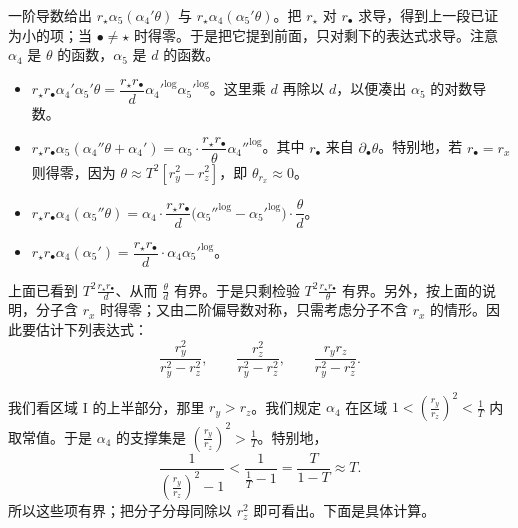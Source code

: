 一阶导数给出 $r_\star\alpha_5(\alpha_4'\theta)$ 与 $r_\star\alpha_4(\alpha_5'\theta)$。把 $r_\star$ 对 $r_\bullet$ 求导，得到上一段已证为小的项；当 $\bullet\ne\star$ 时得零。于是把它提到前面，只对剩下的表达式求导。注意 $\alpha_4$ 是 $\theta$ 的函数，$\alpha_5$ 是 $d$ 的函数。
\begin{itemize}[leftmargin=2.2em,itemsep=0.25em]
\item $r_\star r_\bullet\alpha_4'\alpha_5'\theta=\dfrac{r_\star r_\bullet}{d}{\alpha_4'}^{\log}{\alpha_5'}^{\log}$。这里乘 $d$ 再除以 $d$，以便凑出 $\alpha_5$ 的对数导数。
\item $r_\star r_\bullet\alpha_5(\alpha_4''\theta+\alpha_4')=\alpha_5\cdot\dfrac{r_\star r_\bullet}{\theta}{\alpha_4''}^{\log}$。其中 $r_\bullet$ 来自 $\partial_\bullet\theta$。特别地，若 $r_\bullet=r_x$ 则得零，因为 $\theta\approx T^2[r_y^2-r_z^2]$，即 $\theta_{r_x}\approx0$。
\end{itemize}

\begin{itemize}[leftmargin=2.2em,itemsep=0.25em]
\item $r_\star r_\bullet\alpha_4(\alpha_5''\theta)=\alpha_4\cdot\dfrac{r_\star r_\bullet}{d}\big({\alpha_5''}^{\log}-{\alpha_5'}^{\log}\big)\cdot\dfrac{\theta}{d}$。
\item $r_\star r_\bullet\alpha_4(\alpha_5')=\dfrac{r_\star r_\bullet}{d}\cdot\alpha_4{\alpha_5'}^{\log}$。
\end{itemize}

上面已看到 $T^2\frac{r_\star r_\bullet}{d}$、从而 $\frac{\theta}{d}$ 有界。于是只剩检验 $T^2\frac{r_\star r_\bullet}{\theta}$ 有界。另外，按上面的说明，分子含 $r_x$ 时得零；又由二阶偏导数对称，只需考虑分子不含 $r_x$ 的情形。因此要估计下列表达式：
\[
\frac{r_y^2}{r_y^2-r_z^2},\qquad
\frac{r_z^2}{r_y^2-r_z^2},\qquad
\frac{r_yr_z}{r_y^2-r_z^2}.
\]

我们看区域 I 的上半部分，那里 $r_y>r_z$。我们规定 $\alpha_4$ 在区域 $1<\left(\frac{r_y}{r_z}\right)^2<\frac1T$ 内取常值。于是 $\alpha_4$ 的支撑集是 $\left(\frac{r_y}{r_z}\right)^2>\frac1T$。特别地，
\[
\frac{1}{\left(\frac{r_y}{r_z}\right)^2-1}<\frac{1}{\frac1T-1}=\frac{T}{1-T}\approx T.
\]
所以这些项有界；把分子分母同除以 $r_z^2$ 即可看出。下面是具体计算。

